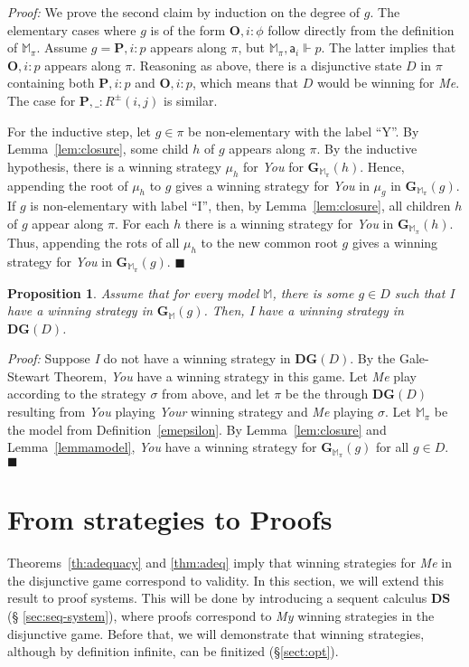 \documentclass{easychair}
\newcommand{\I}{\emph{I}\xspace}
\newcommand{\You}{\emph{You}\xspace}
\newcommand{\My}{\emph{My}\xspace}
\newcommand{\Me}{\emph{Me}\xspace}
\newcommand{\Your}{\emph{Your}\xspace}
\newcommand{\DS}{\mathbf{DS}}
\newcommand{\M}{\mathbb{M}}
\newcommand{\ag}{\mathsf{a}}
\renewcommand{\qed}{\hfill$\blacksquare$}
\newtheorem{proposition}{Proposition}
\renewenvironment{proof}{\noindent\textit{Proof:}\quad}{\qed}
\begin{document}
\begin{proof}
We prove the second claim by induction on the degree of $g$. The elementary cases
where $g$ is of the form $\mathbf{O}, i: \phi$ follow directly from the
definition of $\M_\pi$. Assume $g= \mathbf{P}, i: p$ appears along $\pi$, but
$\M_\pi,\ag_i\Vdash p$. The latter implies that 
$\mathbf{O}, i: p$ appears along $\pi$. Reasoning as above, there is a disjunctive state $D$ in $\pi$ containing both $\mathbf{P}, i: p$ and $\mathbf{O}, i: p$, which means that $D$ would be winning for \Me. The case for $\mathbf{P}, \_: R^\pm(i,j)$ is similar.

For the inductive step, let $g\in \pi$ be non-elementary with the label ``Y''.
By Lemma~\ref{lem:closure}, some child $h$ of $g$ appears along $\pi$. By the
inductive hypothesis, there is a winning strategy $\mu_{h}$ for \You for
$\mathbf{G}_{\M_\pi}(h)$. Hence, appending the root of $\mu_h$ to $g$ gives a
winning strategy for \You in $\mu_g$ in $\mathbf{G}_{\M_\pi}(g)$.
If $g$ is non-elementary with label ``I'', then, by Lemma~\ref{lem:closure},
all children $h$ of $g$ appear along $\pi$. For each $h$ there is a winning
strategy for \You in $\mathbf{G}_{\M_\pi}(h)$. Thus, appending the rots of all
$\mu_h$ to the new common root $g$ gives a winning strategy for \You in
$\mathbf{G}_{\M_{\pi}}(g)$. 
\end{proof}

\begin{proposition}\label{prop:adq-D}
    Assume that 
 for every model $\mathbb{M}$, there is some $g\in D$ such that \I have a winning strategy in $\mathbf{G}_\mathbb{M}(g)$.
 Then, 
 \I have a winning strategy in $\mathbf{DG}(D)$.
\end{proposition}
\begin{proof}
Suppose \I do not have a winning strategy in $\mathbf{DG}(D)$.
By the Gale-Stewart Theorem, \You have a winning strategy in this game. Let \Me
play according to the strategy $\sigma$ from above, and let $\pi$ be the through $\mathbf{DG}(D)$ resulting from \You playing \Your winning strategy and \Me playing $\sigma$. Let $\M_\pi$ be the model from
Definition~\ref{emepsilon}. By Lemma~\ref{lem:closure} and
Lemma~\ref{lemmamodel}, \You have a winning strategy for $\mathbf{G}_{\M_\pi}(g)$ for all $g\in D$. 
\end{proof}

 

\section{From strategies to Proofs}\label{sec:proofs}
Theorems~\ref{th:adequacy} and \ref{thm:adeq} imply that winning strategies for \Me in the disjunctive game correspond to validity. 
In this section, we will extend this result to proof systems. 
This will be done by introducing a sequent calculus $\DS$ (\S
\ref{sec:seq-system}), where proofs correspond to \My winning strategies in the
disjunctive game. Before that, we will demonstrate that winning strategies, although
by definition infinite, can be finitized (\S \ref{sect:opt}). 
\end{document}
